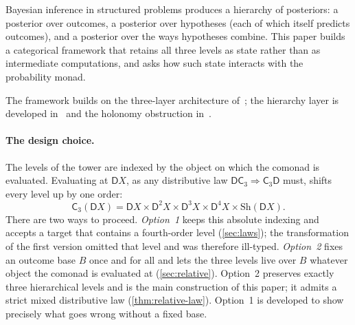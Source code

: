 \documentclass[11pt]{article}
\theoremstyle{definition}
\theoremstyle{remark}
\newcommand{\D}{\mathsf{D}}
\newcommand{\Sh}{\mathrm{Sh}}
\newcommand{\C}{\mathsf{C}}
\begin{document}
Bayesian inference in structured problems produces a hierarchy of posteriors: a posterior over
outcomes, a posterior over hypotheses (each of which itself predicts outcomes), and a posterior over
the ways hypotheses combine. This paper builds a categorical framework that retains all three levels
as state rather than as intermediate computations, and asks how such state interacts with the
probability monad.

The framework builds on the three-layer architecture of~\cite{Awasthi-ThreeLayers}; the hierarchy
layer is developed in~\cite{Awasthi-Hierarchy} and the holonomy obstruction
in~\cite{Awasthi-Holonomy}.

\paragraph{The design choice.} The levels of the tower are indexed by the object on which the
comonad is evaluated. Evaluating at $\D X$, as any distributive law $\D\C_3\Rightarrow\C_3\D$ must,
shifts every level up by one order:
\[
\C_3(\D X)=\D X\times\D^2X\times\D^3X\times\D^4X\times\Sh(\D X).
\]
There are two ways to proceed. \emph{Option~1} keeps this absolute indexing and accepts a target that
contains a fourth-order level (\cref{sec:laws}); the transformation of the first version omitted that
level and was therefore ill-typed. \emph{Option~2} fixes an outcome base $B$ once and for all and lets
the three levels live over $B$ whatever object the comonad is evaluated at (\cref{sec:relative}).
Option~2 preserves exactly three hierarchical levels and is the main construction of this paper; it
admits a strict mixed distributive law (\cref{thm:relative-law}). Option~1 is developed to show
precisely what goes wrong without a fixed base.
\end{document}

